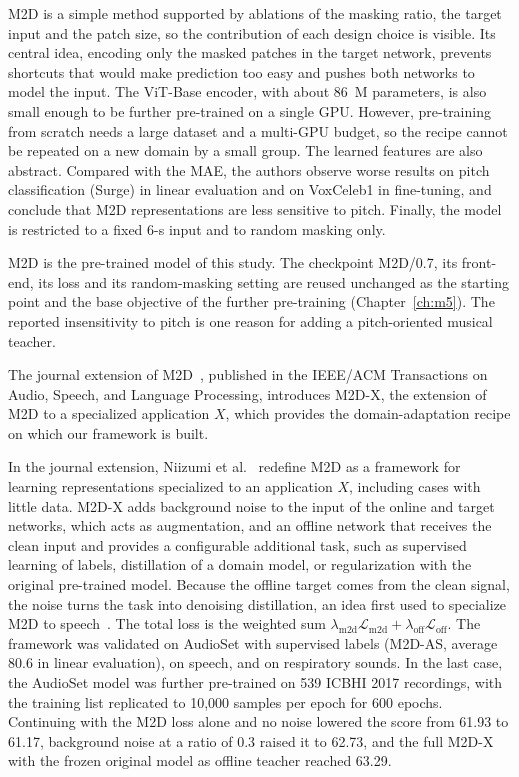 \documentclass{FastFyp}
\begin{document}
\lrcritical
M2D is a simple method supported by ablations of the masking ratio, the target input and the patch size, so the contribution of each design choice is visible. Its central idea, encoding only the masked patches in the target network, prevents shortcuts that would make prediction too easy and pushes both networks to model the input. The ViT-Base encoder, with about 86~M parameters, is also small enough to be further pre-trained on a single GPU. However, pre-training from scratch needs a large dataset and a multi-GPU budget, so the recipe cannot be repeated on a new domain by a small group. The learned features are also abstract. Compared with the MAE, the authors observe worse results on pitch classification (Surge) in linear evaluation and on VoxCeleb1 in fine-tuning, and conclude that M2D representations are less sensitive to pitch. Finally, the model is restricted to a fixed 6-s input and to random masking only.

\lrrelation
M2D is the pre-trained model of this study. The checkpoint M2D/0.7, its front-end, its loss and its random-masking setting are reused unchanged as the starting point and the base objective of the further pre-training (Chapter~\ref{ch:m5}). The reported insensitivity to pitch is one reason for adding a pitch-oriented musical teacher.

The journal extension of M2D~\cite{ref:Niizumi:2024m2dx}, published in the IEEE/ACM Transactions on Audio, Speech, and Language Processing, introduces M2D-X, the extension of M2D to a specialized application $X$, which provides the domain-adaptation recipe on which our framework is built.

\lrsummary
In the journal extension, Niizumi et al.~\cite{ref:Niizumi:2024m2dx} redefine M2D as a framework for learning representations specialized to an application $X$, including cases with little data. M2D-X adds background noise to the input of the online and target networks, which acts as augmentation, and an offline network that receives the clean input and provides a configurable additional task, such as supervised learning of labels, distillation of a domain model, or regularization with the original pre-trained model. Because the offline target comes from the clean signal, the noise turns the task into denoising distillation, an idea first used to specialize M2D to speech~\cite{ref:Niizumi:2023m2ds}. The total loss is the weighted sum $\lambda_{\mathrm{m2d}}\mathcal{L}_{\mathrm{m2d}}+\lambda_{\mathrm{off}}\mathcal{L}_{\mathrm{off}}$. The framework was validated on AudioSet with supervised labels (M2D-AS, average 80.6 in linear evaluation), on speech, and on respiratory sounds. In the last case, the AudioSet model was further pre-trained on 539 ICBHI 2017 recordings, with the training list replicated to 10,000 samples per epoch for 600 epochs. Continuing with the M2D loss alone and no noise lowered the score from 61.93 to 61.17, background noise at a ratio of 0.3 raised it to 62.73, and the full M2D-X with the frozen original model as offline teacher reached 63.29.
\end{document}
